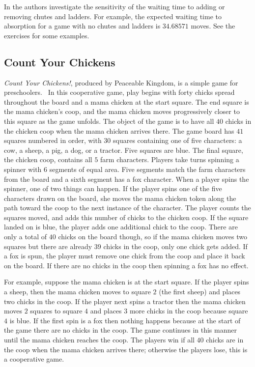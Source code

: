 \documentclass[12pt]{article}
\begin{document}
In
\cite{althoen93} the authors investigate the sensitivity of the waiting
time to adding or removing chutes and ladders.  For example, the
expected waiting time to absorption for a game with no chutes and
ladders is \( 34.68571 \) moves.  See the exercises for some examples.

\subsection*{Count Your Chickens}

\emph{Count Your Chickens!}, produced by Peaceable Kingdom, is a simple
game for preschoolers.~%
In this cooperative game, play begins with forty chicks spread
throughout the board and a mama chicken at the start square.  The end
square is the mama chicken’s coop, and the mama chicken moves
progressively closer to this square as the game unfolds.  The object of
the game is to have all \( 40 \) chicks in the chicken coop when the
mama chicken arrives there.  The game board has \( 41 \) squares
numbered in order, with \( 30 \) squares containing one of five
characters:  a cow, a sheep, a pig, a dog, or a tractor.  Five squares
are blue.  The final square, the chicken coop, contains all \( 5 \) farm
characters.  Players take turns spinning a spinner with 6 segments of
equal area.  Five segments match the farm characters from the board and
a sixth segment has a fox character.  When a player spins the spinner,
one of two things can happen.  If the player spins one of the five
characters drawn on the board, she moves the mama chicken token along
the path toward the coop to the next instance of the character.  The
player counts the squares moved, and adds this number of chicks to the
chicken coop.  If the square landed on is blue, the player adds one
additional chick to the coop.  There are only a total of \( 40 \) chicks
on the board though, so if the mama chicken moves two squares but there
are already 39 chicks in the coop, only one chick gets added.  If a fox
is spun, the player must remove one chick from the coop and place it
back on the board.  If there are no chicks in the coop then spinning a
fox has no effect.

For example, suppose the mama chicken is at the start square.  If the
player spins a sheep, then the mama chicken moves to square \( 2 \) (the
first sheep) and places two chicks in the coop.  If the player next
spins a tractor then the mama chicken moves \( 2 \) squares to square \(
4 \) and places \( 3 \) more chicks in the coop because square \( 4 \)
is blue.  If the first spin is a fox then nothing happens because at the
start of the game there are no chicks in the coop.  The game continues
in this manner until the mama chicken reaches the coop.  The players win
if all \( 40 \) chicks are in the coop when the mama chicken arrives
there; otherwise the players lose, this is a cooperative game.
\end{document}
